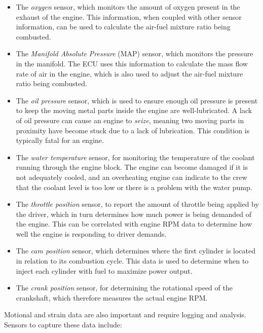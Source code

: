 \begin{itemize}

\item The \emph{oxygen} sensor, which monitors the amount of oxygen present in the exhaust of the engine. This information, when coupled with other sensor information, can be used to calculate the air-fuel mixture ratio being combusted.

\item The \emph{Manifold Absolute Pressure} (MAP) sensor, which monitors the pressure in the manifold. The ECU uses this information to calculate the mass flow rate of air in the engine, which is also used to adjust the air-fuel mixture ratio being combusted.

\item The \emph{oil pressure} sensor, which is used to ensure enough oil pressure is present to keep the moving metal parts inside the engine are well-lubricated. A lack of oil pressure can cause an engine to \emph{seize}, meaning two moving parts in proximity have become stuck due to a lack of lubrication. This condition is typically fatal for an engine.

\item The \emph{water temperature} sensor, for monitoring the temperature of the coolant running through the engine block. The engine can become damaged if it is not adequately cooled, and an overheating engine can indicate to the crew that the coolant level is too low or there is a problem with the water pump.

\item The \emph{throttle position} sensor, to report the amount of throttle being applied by the driver, which in turn determines how much power is being demanded of the engine. This can be correlated with engine RPM data to determine how well the engine is responding to driver demands.

\item The \emph{cam position} sensor, which determines where the first cylinder is located in relation to its combustion cycle. This data is used to determine when to inject each cylinder with fuel to maximize power output.

\item The \emph{crank position} sensor, for determining the rotational speed of the crankshaft, which therefore measures the actual engine RPM. 

\end{itemize}

Motional and strain data are also important and require logging and analysis. Sensors to capture these data include:

